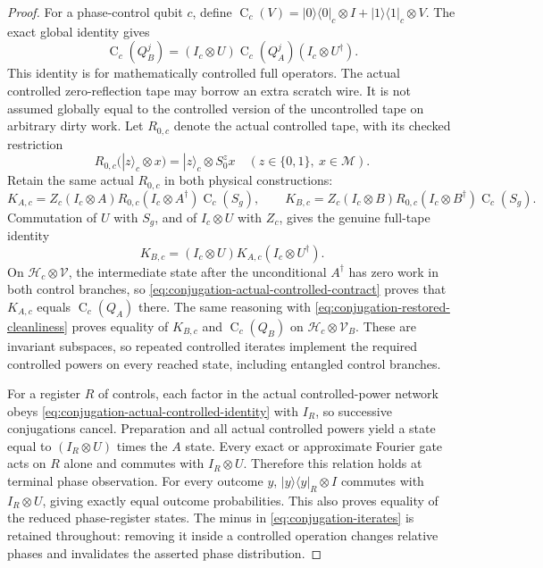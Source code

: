 \begin{proof}
For a phase-control qubit $c$, define
$\operatorname{C}_c(V)=|0\rangle\langle0|_c\otimes I+
|1\rangle\langle1|_c\otimes V$. The exact global identity gives
\begin{equation}
 \operatorname{C}_c(Q_B^j)
 =(I_c\otimes U)\operatorname{C}_c(Q_A^j)(I_c\otimes U^\dagger).
 \label{eq:conjugation-controlled}
\end{equation}
This identity is for mathematically controlled full operators. The
actual controlled zero-reflection tape may borrow an extra scratch
wire. It is not assumed globally equal to the controlled version of
the uncontrolled tape on arbitrary dirty work. Let $R_{0,c}$ denote
the actual controlled tape, with its checked restriction
\begin{equation}
 R_{0,c}(|z\rangle_c\otimes x)
 =|z\rangle_c\otimes S_0^z x
 \quad(z\in\{0,1\},\ x\in\mathcal M).
 \label{eq:conjugation-actual-controlled-contract}
\end{equation}
Retain the same actual $R_{0,c}$ in both physical constructions:
\begin{equation}
 K_{A,c}=Z_c(I_c\otimes A)R_{0,c}(I_c\otimes A^\dagger)
                   \operatorname C_c(S_g),\qquad
 K_{B,c}=Z_c(I_c\otimes B)R_{0,c}(I_c\otimes B^\dagger)
                   \operatorname C_c(S_g).
 \label{eq:conjugation-actual-controlled-iterates}
\end{equation}
Commutation of $U$ with $S_g$, and of $I_c\otimes U$ with $Z_c$,
gives the genuine full-tape identity
\begin{equation}
 K_{B,c}=(I_c\otimes U)K_{A,c}(I_c\otimes U^\dagger).
 \label{eq:conjugation-actual-controlled-identity}
\end{equation}
On $\mathcal H_c\otimes\mathcal V$, the intermediate state after
the unconditional $A^\dagger$ has zero work in both control branches,
so \eqref{eq:conjugation-actual-controlled-contract} proves that
$K_{A,c}$ equals $\operatorname C_c(Q_A)$ there. The same reasoning
with \eqref{eq:conjugation-restored-cleanliness} proves equality of
$K_{B,c}$ and $\operatorname C_c(Q_B)$ on
$\mathcal H_c\otimes\mathcal V_B$. These are invariant subspaces,
so repeated controlled iterates implement the required controlled
powers on every reached state, including entangled control branches.

For a register $R$ of controls, each factor in the actual
controlled-power network obeys
\eqref{eq:conjugation-actual-controlled-identity} with $I_R$, so
successive conjugations cancel. Preparation and all actual controlled
powers yield a state equal to $(I_R\otimes U)$ times the $A$ state.
Every exact or approximate Fourier gate acts on $R$ alone and commutes
with $I_R\otimes U$. Therefore this relation holds at terminal phase
observation. For every outcome $y$,
$|y\rangle\langle y|_R\otimes I$ commutes with $I_R\otimes U$,
giving exactly equal outcome probabilities. This also proves equality
of the reduced phase-register states. The minus in
\eqref{eq:conjugation-iterates} is retained throughout: removing it
inside a controlled operation changes relative phases and invalidates
the asserted phase distribution.
\end{proof}

